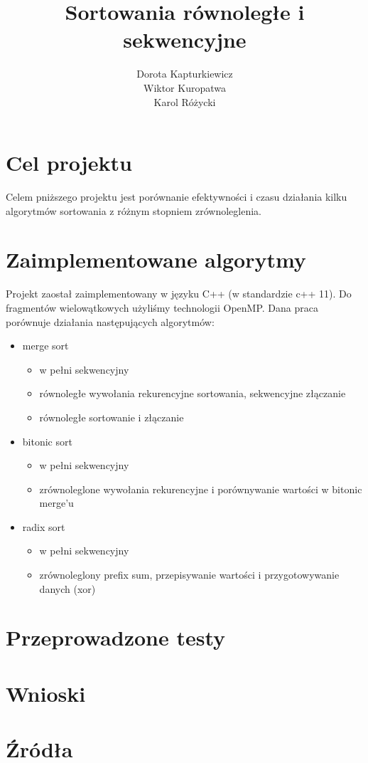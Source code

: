\documentclass[11pt]{article}
\title{\textbf{Sortowania równoległe i sekwencyjne}}
\author{Dorota Kapturkiewicz\\
		Wiktor Kuropatwa\\
		Karol Różycki}
\date{}
\begin{document}
\maketitle

\section{Cel projektu}
Celem pniższego projektu jest porównanie efektywności i czasu działania kilku algorytmów sortowania z różnym stopniem zrównoleglenia.

\section{Zaimplementowane algorytmy}
Projekt zaostał zaimplementowany w języku C++ (w standardzie c++ 11).
Do fragmentów wielowątkowych użyliśmy technologii OpenMP. \newline
Dana praca porównuje działania następujących algorytmów:
\begin{itemize}

\item merge sort 
\begin{itemize}
\item w pełni sekwencyjny 
\item równoległe wywołania rekurencyjne sortowania, sekwencyjne złączanie
\item równoległe sortowanie i złączanie
\end{itemize}

\item bitonic sort
\begin{itemize}
\item w pełni sekwencyjny 
\item zrównoleglone wywołania rekurencyjne i porównywanie wartości w bitonic merge'u
\end{itemize}

\item radix sort
\begin{itemize}
\item w pełni sekwencyjny 
\item zrównoleglony prefix sum, przepisywanie wartości i przygotowywanie danych (xor)
\end{itemize}

\end{itemize}


\section{Przeprowadzone testy}



\section{Wnioski}

\section{Źródła}
\end{document}
